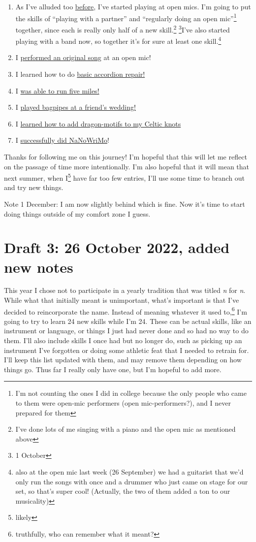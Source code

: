 \documentclass[12pt]{article}[titlepage]
\newcommand{\say}[1]{``#1''}
\newcommand{\1}{\={a}}
\newcommand{\2}{\={e}}
\newcommand{\3}{\={\i}}
\newcommand{\4}{\=o}
\newcommand{\5}{\=u}
\newcommand{\6}{\={A}}
\renewcommand{\,}{\textsuperscript{,}}
\begin{document}
\begin{enumerate}
\item As I've alluded too \href{open-mic-2.html}{before}, I've started playing at open mics.
I'm going to put the skills of \say{playing with a partner} and \say{regularly doing an open mic}\footnote{I'm not counting the ones I did in college because the only people who came to them were open-mic performers (open mic-performers?), and I never prepared for them} together, since each is really only half of a new skill.\footnote{I've done lots of me singing with a piano and the open mic as mentioned above} \footnote{1 October}I've also started playing with a band now, so together it's for sure at least one skill.\footnote{also at the open mic last week (26 September) we had a guitarist that we'd only run the songs with once and a drummer who just came on stage for our set, so that's super cool! (Actually, the two of them added a ton to our musicality)}
\item I \href{performing-a-song.html}{performed an original song} at an open mic!
\item I learned how to do \href{accordion-repair.html}{basic accordion repair!}
\item I \href{running-2.html}{was able to run five miles!} 
\item I \href{bagpipes.html}{played bagpipes at a friend's wedding!}
\item I \href{celtic-knots.html}{learned how to add dragon-motifs to my Celtic knots}
\item I \href{nanowrimo-4.html}{successfully did NaNoWriMo}!
\end{enumerate}

Thanks for following me on this journey!
I'm hopeful that this will let me reflect on the passage of time more intentionally.
I'm also hopeful that it will mean that next summer, when I\footnote{likely} have far too few entries, I'll use some time to branch out and try new things.

Note 1 December: I am now slightly behind which is fine.
Now it's time to start doing things outside of my comfort zone I guess.


\section{Draft 3: 26 October 2022, added new notes}
This year I chose not to participate in a yearly tradition that was titled \textit{n} for \textit{n}.
While what that initially meant is unimportant, what's important is that I've decided to reincorporate the name.
Instead of meaning whatever it used to,\footnote{truthfully, who can remember what it meant?} I'm going to try to learn 24 new skills while I'm 24.
These can be actual skills, like an instrument or language, or things I just had never done and so had no way to do them.
I'll also include skills I once had but no longer do, such as picking up an instrument I've forgotten or doing some athletic feat that I needed to retrain for.
I'll keep this list updated with them, and may remove them depending on how things go.
Thus far I really only have one, but I'm hopeful to add more.
\end{document}
